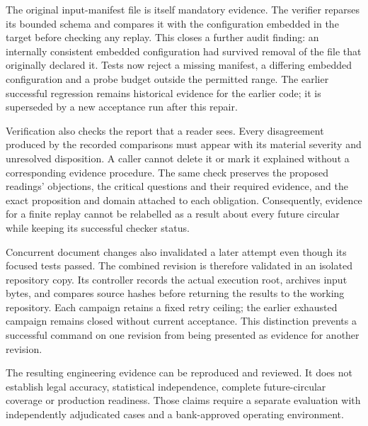 The original input-manifest file is itself mandatory evidence. The verifier
reparses its bounded schema and compares it with the configuration embedded in
the target before checking any replay. This closes a further audit finding: an
internally consistent embedded configuration had survived removal of the file
that originally declared it. Tests now reject a missing manifest, a differing
embedded configuration and a probe budget outside the permitted range. The
earlier successful regression remains historical evidence for the earlier code;
it is superseded by a new acceptance run after this repair.

Verification also checks the report that a reader sees. Every disagreement
produced by the recorded comparisons must appear with its material severity
and unresolved disposition. A caller cannot delete it or mark it explained
without a corresponding evidence procedure. The same check preserves the
proposed readings' objections, the critical questions and their required
evidence, and the exact proposition and domain attached to each obligation.
Consequently, evidence for a finite replay cannot be relabelled as a result
about every future circular while keeping its successful checker status.

Concurrent document changes also invalidated a later attempt even though its
focused tests passed. The combined revision is therefore validated in an
isolated repository copy. Its controller records the actual execution root,
archives input bytes, and compares source hashes before returning the results
to the working repository. Each campaign retains a fixed retry ceiling; the
earlier exhausted campaign remains closed without current acceptance. This
distinction prevents a successful command on one revision from being presented
as evidence for another revision.

The resulting engineering evidence can be
reproduced and reviewed. It does not establish legal accuracy, statistical
independence, complete future-circular coverage or production readiness. Those
claims require a separate evaluation with independently adjudicated cases and a
bank-approved operating environment.
